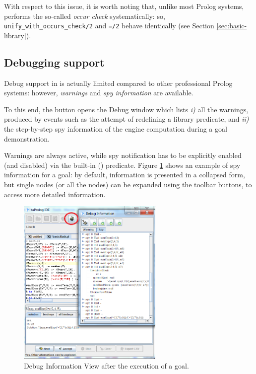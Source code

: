 With respect to this issue, it is worth noting that, unlike most Prolog systems, \tuprolog{} performs the so-called \textit{occur check} systematically: so, \texttt{unify\_with\_occurs\_check/2} and \texttt{=/2} behave identically (see Section \ref{sec:basic-library}).

\subsection{Debugging support}
\label{ssec:debugging-support}

Debug support in \tuprolog{} is actually limited compared to other professional Prolog systems: however, \textit{warnings} and \textit{spy information} are available.

To this end, the  button opens the Debug window which lists \textit{i)} all the warnings, produced by events such as the attempt of redefining a library predicate, and \textit{ii)} the step-by-step spy information of the engine computation during a goal demonstration.

Warnings are always active, while spy notification has to be explicitly enabled (and disabled) via the built-in  () predicate.
%
Figure \ref{fig:gui-debug} shows an example of spy information for a goal: by default, information is presented in a collapsed form, but single nodes (or all the nodes) can be expanded using the toolbar buttons, to access more detailed information.

\begin{figure}
\centering
\includegraphics[width=7cm]{images/gui-debug}
\caption{Debug Information View after the execution of a goal.}
\label{fig:gui-debug}
\end{figure}


